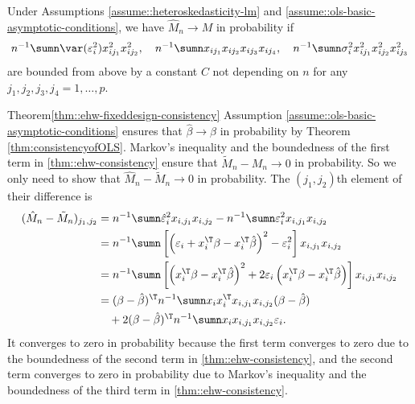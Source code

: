 \begin{theorem}\label{thm::ehw-fixeddesign-consistency}
Under Assumptions \ref{assume::heteroskedasticity-lm} and \ref{assume::ols-basic-asymptotic-conditions}, 
we have $\hat{M}_{n}\rightarrow M$ in probability
if
\begin{equation}
\label{thm::ehw-consistency}
n^{-1}\sumn\var(\varepsilon_{i}^{2})x_{ij_1}^2 x_{ij_2}^2,\quad
n^{-1}\sumn x_{ij_{1}}x_{ij_{2}}x_{ij_{3}}x_{ij_{4}} ,\quad
n^{-1}\sumn\sigma_{i}^{2}x_{ij_{1}}^{2}x_{ij_{2}}^{2}x_{ij_{3}}^{2}
\end{equation}
are bounded from above by a constant $C$ not depending on $n$ for any $j_{1},j_{2},j_{3},j_{4}=1,\ldots,p$. 
\end{theorem}
%
\begin{myproof}{Theorem}{\ref{thm::ehw-fixeddesign-consistency}}
Assumption \ref{assume::ols-basic-asymptotic-conditions} ensures that $\hat{\beta}\rightarrow\beta$
in probability by Theorem \ref{thm:consistencyofOLS}. Markov's inequality and the boundedness of the first term in \eqref{thm::ehw-consistency}
ensure that $\tilde{M}_{n}-M_{n}\rightarrow0$ in probability. So
we only need to show that $\hat{M}_{n}-\tilde{M}_{n}\rightarrow0$
in probability. The $(j_{1},j_{2})$th element of their difference
is
\begin{align*}
(\hat{M}_{n}-\tilde{M}_{n})_{j_{1},j_{2}} & =n^{-1}\sumn\hat{\varepsilon}_{i}^{2}x_{i,j_{1}}x_{i,j_{2}}-n^{-1}\sumn\varepsilon_{i}^{2}x_{i,j_{1}}x_{i,j_{2}}\\
 & =n^{-1}\sumn\left[\left(\varepsilon_{i}+x_{i}^{\T}\beta-x_{i}^{\T}\hat{\beta}\right)^{2}-\varepsilon_{i}^{2}\right]x_{i,j_{1}}x_{i,j_{2}}\\
 & =n^{-1}\sumn\left[\left(x_{i}^{\T}\beta-x_{i}^{\T}\hat{\beta}\right)^{2}+2\varepsilon_{i}\left(x_{i}^{\T}\beta-x_{i}^{\T}\hat{\beta}\right)\right]x_{i,j_{1}}x_{i,j_{2}}\\
 & =(\beta-\hat{\beta})^{\T}n^{-1}\sumn x_{i}x_{i}^{\T}x_{i,j_{1}}x_{i,j_{2}}(\beta-\hat{\beta}) \\
 & \quad +2(\beta-\hat{\beta})^{\T}n^{-1}\sumn x_{i}x_{i,j_{1}}x_{i,j_{2}}\varepsilon_{i}.
\end{align*}
It converges to zero in probability because the first term converges
to zero due to the boundedness of the second term in \eqref{thm::ehw-consistency}, and the second term
converges to zero in probability due to Markov's inequality and the boundedness of the third term in \eqref{thm::ehw-consistency}. 
\end{myproof}



